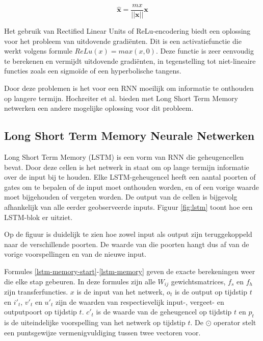 \begin{equation}
    \mathbf{\hat{x}} = \frac{mx}{||\mathbf{x}||}\mathbf{x}
\end{equation}

Het gebruik van Rectified Linear Units of ReLu-encodering biedt een oplossing voor het probleem van uitdovende gradi\"enten. Dit is een activatiefunctie die werkt volgens formule $ReLu(x) = max(x,0)$. Deze functie is zeer eenvoudig te berekenen en vermijdt uitdovende gradi\"enten, in tegenstelling tot niet-lineaire functies zoals een sigmo\"ide of een hyperbolische tangens\cite{Glorot2011}.

Door deze problemen is het voor een RNN moeilijk om informatie te onthouden op langere termijn. Hochreiter et al.\cite{SeppHochreiter1997} bieden met Long Short Term Memory netwerken een andere mogelijke oplossing voor dit probleem.

\subsection{Long Short Term Memory Neurale Netwerken}
\label{sub:lstm}
Long Short Term Memory (LSTM) is een vorm van RNN die geheugencellen bevat. Door deze cellen is het netwerk in staat om op lange termijn informatie over de input bij te houden. Elke LSTM-geheugencel heeft een aantal poorten of gates om te bepalen of de input moet onthouden worden, en of een vorige waarde moet bijgehouden of vergeten worden. De output van de cellen is bijgevolg afhankelijk van alle eerder geobserveerde inputs. Figuur \ref{fig:lstm} toont hoe een LSTM-blok er uitziet\cite{SeppHochreiter1997,Google}.

Op de figuur is duidelijk te zien hoe zowel input als output zijn teruggekoppeld naar de verschillende poorten. De waarde van die poorten hangt dus af van de vorige voorspellingen en van de nieuwe input.

Formules \eqref{lstm-memory-start}-\eqref{lstm-memory} geven de exacte berekeningen weer die elke stap gebeuren. In deze formules zijn alle $W_{ij}$ gewichtsmatrices, $f_s$ en $f_h$ zijn transferfuncties. $x$ is de input van het netwerk, $o_t$ is de output op tijdstip $t$ en $i'_t$, $v'_t$ en $u'_t$ zijn de waarden van respectievelijk input-, vergeet- en outputpoort op tijdstip $t$. $c'_t$ is de waarde van de geheugencel op tijdstip $t$ en $p_t$ is de uiteindelijke voorspelling van het netwerk op tijdstip $t$. De $\odot$ operator stelt een puntsgewijze vermenigvuldiging tussen twee vectoren voor.


